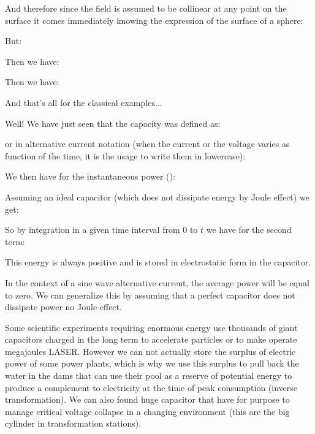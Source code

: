 	And therefore since the field is assumed to be collinear at any point on the surface it comes immediately knowing the expression of the surface of a sphere:
	
	But:
	
	Then we have:
	
	Then we have:
	
	And that's all for the classical examples...
	
	Well! We have just seen that the capacity was defined as:
	
	or in alternative current notation (when the current or the voltage varies as function of the time, it is the usage to write them in lowercase):
	
	We then have for the instantaneous power ():	
	
	Assuming an ideal capacitor (which does not dissipate energy by Joule effect) we get:
	
	So by integration in a given time interval from $0$ to $t$ we have for the second term:
	
	This energy is always positive and is stored in electrostatic form in the capacitor.
	
	In the context of a sine wave alternative current, the average power will be equal to zero. We can generalize this by assuming that a perfect capacitor does not dissipate power no Joule effect.
	\begin{tcolorbox}[title=Remark,colframe=black,arc=10pt]
	Some scientific experiments requiring enormous energy use thousands of giant capacitors charged in the long term to accelerate particles or to make operate megajoules LASER. However we can not actually store the surplus of electric power of some power plants, which is why we use this surplus to pull back the water in the dams that can use their pool as a reserve of potential energy to produce a complement to electricity at the time of peak consumption (inverse transformation). We can also found huge capacitor that have for purpose to manage critical voltage collapse in a changing environment (this are the big cylinder in transformation stations).
	\end{tcolorbox}
	
	
